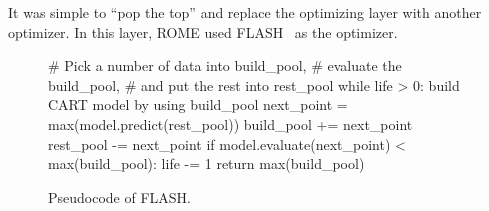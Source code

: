 \documentclass[sigconf,review]{acmart}
\begin{document}
It was simple  to ``pop the top'' and replace the optimizing layer with another optimizer. In this layer, ROME used FLASH~\cite{nair2017flash} as the optimizer.

\begin{figure}
\begin{pythoncode}
    # Pick a number of data into build_pool, 
    # evaluate the build_pool, 
    # and put the rest into rest_pool
    while life > 0:
      build CART model by using build_pool
      next_point = max(model.predict(rest_pool))
      build_pool += next_point
      rest_pool -= next_point
      if model.evaluate(next_point) < max(build_pool):
          life -= 1
    return max(build_pool)
\end{pythoncode}
\caption{Pseudocode of FLASH.}\label{flash}  
\end{figure}
\end{document}
